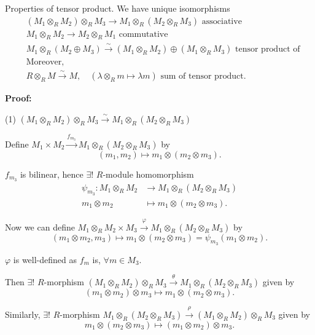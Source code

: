 \documentclass[11pt, a4paper]{report}
\begin{document}
\begin{proposition}
Properties of tensor product. We have unique isomorphisms
\begin{align*}
& (M_{1} \otimes_{R} M_{2}) \otimes_{R} M_{3} \longrightarrow M_{1} \otimes_{R} (M_{2} \otimes_{R} M_{3}) \text{ associative} \\
& M_{1} \otimes_{R} M_{2} \longrightarrow M_{2} \otimes_{R} M_{1} \text{ commutative} \\
& M_{1} \otimes_{R} (M_{2} \oplus M_{3}) \xrightarrow{\sim} (M_{1} \otimes_{R} M_{2}) \oplus (M_{1} \otimes_{R} M_{3}) \text{ tensor product of} \\
& \text{Moreover,} \\
& R \otimes_{R} M \xrightarrow{\sim} M, \quad (\lambda \otimes_{R} m \mapsto \lambda m) \text{ sum of tensor product.}
\end{align*}

\textbf{Proof:}

(1) $(M_{1} \otimes_{R} M_{2}) \otimes_{R} M_{3} \xrightarrow{\sim} M_{1} \otimes_{R} (M_{2} \otimes_{R} M_{3})$

Define $M_{1} \times M_{2} \xrightarrow{f_{m_{3}}} M_{1} \otimes_{R} (M_{2} \otimes_{R} M_{3})$ by
\[
(m_{1}, m_{2}) \mapsto m_{1} \otimes (m_{2} \otimes m_{3}).
\]

$f_{m_{3}}$ is bilinear, hence $\exists!$ $R$-module homomorphism
\[
\begin{aligned}
\psi_{m_{3}}: M_{1} \otimes_{R} M_{2} & \rightarrow M_{1} \otimes_{R} (M_{2} \otimes_{R} M_{3}) \\
m_{1} \otimes m_{2} & \mapsto m_{1} \otimes (m_{2} \otimes m_{3}).
\end{aligned}
\]

Now we can define $M_{1} \otimes_{R} M_{2} \times M_{3} \xrightarrow{\varphi} M_{1} \otimes_{R} (M_{2} \otimes_{R} M_{3})$ by
\[
(m_{1} \otimes m_{2}, m_{3}) \mapsto m_{1} \otimes (m_{2} \otimes m_{3}) = \psi_{m_{3}}(m_{1} \otimes m_{2}).
\]

$\varphi$ is well-defined as $f_{m}$ is, $\forall m \in M_{3}$.

Then $\exists!$ $R$-morphism $(M_{1} \otimes_{R} M_{2}) \otimes_{R} M_{3} \xrightarrow{\theta} M_{1} \otimes_{R} (M_{2} \otimes_{R} M_{3})$ given by
\[
(m_{1} \otimes m_{2}) \otimes m_{3} \mapsto m_{1} \otimes (m_{2} \otimes m_{3}).
\]

Similarly, $\exists!$ $R$-morphism $M_{1} \otimes_{R} (M_{2} \otimes_{R} M_{3}) \xrightarrow{\rho} (M_{1} \otimes_{R} M_{2}) \otimes_{R} M_{3}$ given by
\[
m_{1} \otimes (m_{2} \otimes m_{3}) \mapsto (m_{1} \otimes m_{2}) \otimes m_{3}.
\]


\end{proposition}
\end{document}
